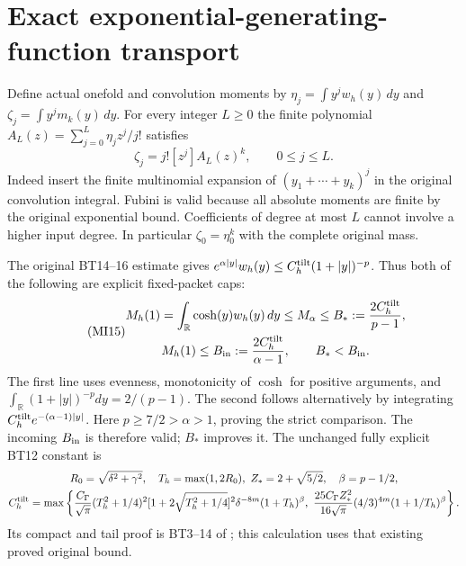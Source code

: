 \documentclass[11pt]{article}
\newcommand{\R}{\mathbb R}
\begin{document}
\section{Exact exponential-generating-function transport}

Define actual onefold and convolution moments by
$\eta_j=\int y^jw_h(y)\,dy$ and
$\zeta_j=\int y^jm_k(y)\,dy$.
For every integer $L\ge0$ the finite polynomial
$A_L(z)=\sum_{j=0}^L\eta_jz^j/j!$ satisfies
\begin{equation}\tag{MI14}\label{mi:egf}
 \zeta_j=j![z^j]A_L(z)^k,\qquad 0\le j\le L.
\end{equation}
Indeed insert the finite multinomial expansion of
$(y_1+\cdots+y_k)^j$ in the original convolution integral.
Fubini is valid because all absolute moments are finite by the
original exponential bound. Coefficients of degree at most $L$
cannot involve a higher input degree. In particular
$\zeta_0=\eta_0^k$ with the complete original mass.

The original BT14--16 estimate \cite{BT} gives
$e^{\alpha|y|}w_h(y)\le C_h^{\rm tilt}(1+|y|)^{-p}$.
Thus both of the following are explicit fixed-packet caps:
\begin{equation}\tag{MI15}\label{mi:B}
 \begin{gathered}
 M_h(1)=\int_\R\cosh(y)w_h(y)\,dy
 \le M_\alpha\le B_*:=\frac{2C_h^{\rm tilt}}{p-1},\\
 M_h(1)\le B_{\rm in}:=\frac{2C_h^{\rm tilt}}{\alpha-1},
 \qquad B_*<B_{\rm in}.
 \end{gathered}
\end{equation}
The first line uses evenness, monotonicity of $\cosh$ for positive
arguments, and
$\int_\R(1+|y|)^{-p}dy=2/(p-1)$.
The second follows alternatively by integrating
$C_h^{\rm tilt}e^{-(\alpha-1)|y|}$.
Here $p\ge7/2>\alpha>1$, proving the strict comparison.
The incoming $B_{\rm in}$ is therefore valid; $B_*$ improves it.
The unchanged fully explicit BT12 constant is
\[
\begin{gathered}
 R_0=\sqrt{\delta^2+\gamma^2},\quad T_h=\max(1,2R_0),\
 Z_*=2+\sqrt{5/2},\quad\beta=p-1/2,\\
 C_h^{\rm tilt}=\max\left\{
 \frac{C_\Gamma}{\sqrt\pi}(T_h^2+1/4)^2
 [1+2\sqrt{T_h^2+1/4}]^2\delta^{-8m}(1+T_h)^\beta,\
 \frac{25C_\Gamma Z_*^2}{16\sqrt\pi}
 (4/3)^{4m}(1+1/T_h)^\beta\right\}.
\end{gathered}
\]
Its compact and tail proof is BT3--14 of \cite{BT}; this
calculation uses that existing proved original bound.
\end{document}
